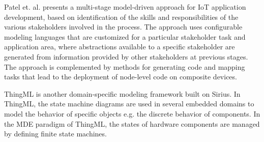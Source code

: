 Patel et. al. \cite{patel2015enabling} presents a multi-stage model-driven approach for IoT application development, based on identification of the skills and responsibilities of the various stakeholders involved in the process. The approach uses configurable modeling languages that are customized for a particular stakeholder task and application area, where abstractions available to a specific stakeholder are generated from information provided by other stakeholders at previous stages. The approach is complemented by methods for generating code and mapping tasks that lead to the deployment of node-level code on composite devices.

ThingML \cite{Fleurey+2011} is another domain-specific modeling framework built on Sirius. In ThingML, the state machine diagrams are used in several embedded domains to model the behavior of specific objects e.g. the discrete behavior of components. In the MDE paradigm of ThingML, the states of hardware components are managed by defining finite state machines.